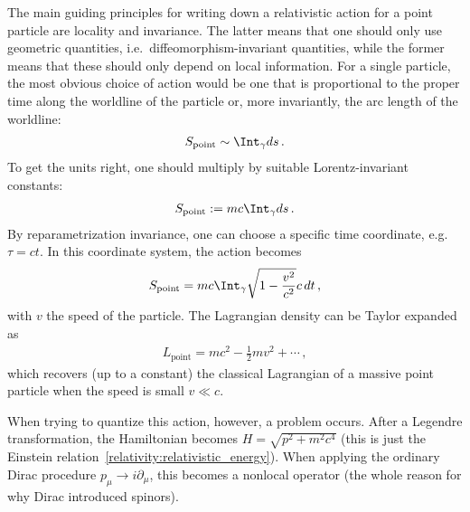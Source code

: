     The main guiding principles for writing down a relativistic action for a point particle are locality and invariance. The latter means that one should only use geometric quantities, i.e.~diffeomorphism-invariant quantities, while the former means that these should only depend on local information. For a single particle, the most obvious choice of action would be one that is proportional to the proper time along the worldline of the particle or, more invariantly, the arc length of the worldline:
    \begin{gather}
        S_{\text{point}}\sim\Int_\gamma ds\,.
    \end{gather}
    To get the units right, one should multiply by suitable Lorentz-invariant constants:
    \begin{gather}
        \label{relativity:worldline_action}
        S_{\text{point}}:=mc\Int_\gamma ds\,.
    \end{gather}
    By reparametrization invariance, one can choose a specific time coordinate, e.g.~$\tau=ct$. In this coordinate system, the action becomes
    \begin{gather}
        S_{\text{point}}=mc\Int_\gamma\sqrt{1-\frac{v^2}{c^2}}c\,dt\,,
    \end{gather}
    with $v$ the speed of the particle. The Lagrangian density can be Taylor expanded as
    \begin{gather}
        L_{\text{point}}=mc^2 - \frac{1}{2}mv^2 + \cdots\,,
    \end{gather}
    which recovers (up to a constant) the classical Lagrangian of a massive point particle when the speed is small $v\ll c$.

    When trying to quantize this action, however, a problem occurs. After a Legendre transformation, the Hamiltonian becomes $H=\sqrt{p^2+m^2c^4}$ (this is just the Einstein relation~\ref{relativity:relativistic_energy}). When applying the ordinary Dirac procedure $p_\mu\longrightarrow i\partial_\mu$, this becomes a nonlocal operator (the whole reason for why Dirac introduced spinors).

